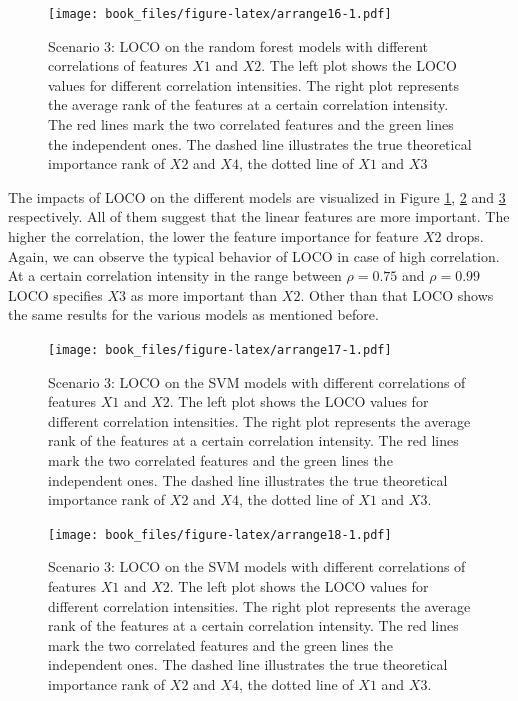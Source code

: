 \documentclass[]{krantz}
\begin{document}
\begin{figure}
\centering
\texttt{[image: book\_files/figure-latex/arrange16-1.pdf]}
\caption{\label{fig:arrange16}Scenario 3: LOCO on the random forest models
with different correlations of features \(X1\) and \(X2\). The left plot
shows the LOCO values for different correlation intensities. The right
plot represents the average rank of the features at a certain
correlation intensity. The red lines mark the two correlated features
and the green lines the independent ones. The dashed line illustrates
the true theoretical importance rank of \(X2\) and \(X4\), the dotted
line of \(X1\) and \(X3\)}
\end{figure}

The impacts of LOCO on the different models are visualized in Figure
\ref{fig:arrange16}, \ref{fig:arrange17} and \ref{fig:arrange18}
respectively. All of them suggest that the linear features are more
important. The higher the correlation, the lower the feature importance
for feature \(X2\) drops. Again, we can observe the typical behavior of
LOCO in case of high correlation. At a certain correlation intensity in
the range between \(\rho=0.75\) and \(\rho=0.99\) LOCO specifies \(X3\)
as more important than \(X2\). Other than that LOCO shows the same
results for the various models as mentioned before.

\begin{figure}
\centering
\texttt{[image: book\_files/figure-latex/arrange17-1.pdf]}
\caption{\label{fig:arrange17}Scenario 3: LOCO on the SVM models with
different correlations of features \(X1\) and \(X2\). The left plot
shows the LOCO values for different correlation intensities. The right
plot represents the average rank of the features at a certain
correlation intensity. The red lines mark the two correlated features
and the green lines the independent ones. The dashed line illustrates
the true theoretical importance rank of \(X2\) and \(X4\), the dotted
line of \(X1\) and \(X3\).}
\end{figure}

\begin{figure}
\centering
\texttt{[image: book\_files/figure-latex/arrange18-1.pdf]}
\caption{\label{fig:arrange18}Scenario 3: LOCO on the SVM models with
different correlations of features \(X1\) and \(X2\). The left plot
shows the LOCO values for different correlation intensities. The right
plot represents the average rank of the features at a certain
correlation intensity. The red lines mark the two correlated features
and the green lines the independent ones. The dashed line illustrates
the true theoretical importance rank of \(X2\) and \(X4\), the dotted
line of \(X1\) and \(X3\).}
\end{figure}
\end{document}
